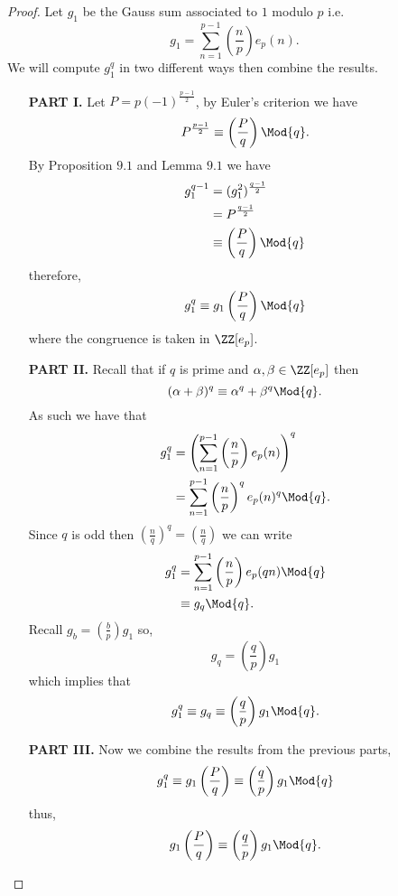 \documentclass[12pt, a4paper]{article}
\begin{document}
\begin{proof}
    Let \(g_1\) be the Gauss sum associated to \(1\) modulo \(p\) i.e. 
    \[g_1 = \sum_{n=1}^{p-1} \left( \frac{n}{p} \right)e_p(n).\]
    We will compute \(g_1^q\) in two different ways then combine the results.
    \begin{enumerate}
        \item[\textbf{PART I.}] Let \(P=p(-1)^{\frac{p-1}{2}}\), by Euler's criterion we have 
        \[P^{\frac{p-1}{2}} \equiv \left( \frac{P}{q} \right) \Mod{q}.\]
        By Proposition \(9.1\) and Lemma \(9.1\) we have
        \[\begin{aligned}
            g_1^{q-1} &= (g_1^2)^{\frac{q-1}{2}} \\
                    &= P^{\frac{q-1}{2}} \\
                    &\equiv \left( \frac{P}{q} \right) \Mod{q}
        \end{aligned}\]
        therefore,
        \[g_1^q \equiv g_1\left( \frac{P}{q} \right) \Mod{q}\]
        where the congruence is taken in \(\ZZ[e_p]\).
        \item[\textbf{PART II.}] Recall that if \(q\) is prime and \(\alpha, \beta \in \ZZ[e_p]\) then
        \[(\alpha+\beta)^q \equiv \alpha^q +\beta^q \Mod{q}.\]
        As such we have that
        \[\begin{aligned}
            g_1^q &= \left( \sum_{n=1}^{p-1} \left( \frac{n}{p} \right) e_p(n)\right)^q \\
            &= \sum_{n=1}^{p-1} \left( \frac{n}{p} \right)^q e_p(n)^q \Mod{q}.
        \end{aligned}\]
        Since \(q\) is odd then \(\left( \frac{n}{q} \right)^q =\left( \frac{n}{q} \right)\) we can write
        \[\begin{aligned}
            g_1^q &=\sum_{n=1}^{p-1} \left( \frac{n}{p} \right) e_p(qn) \Mod{q} \\
            &\equiv g_q \Mod{q}.
        \end{aligned}\]
        Recall \(g_b = \left( \frac{b}{p} \right) g_1\) so,
        \[g_q = \left( \frac{q}{p} \right)g_1\]
        which implies that
        \[g_1^q \equiv g_q \equiv \left( \frac{q}{p} \right)g_1 \Mod{q}.\]
        \item[\textbf{PART III.}] Now we combine the results from the previous parts,
        \[g_1^q \equiv  g_1\left( \frac{P}{q} \right) \equiv\left( \frac{q}{p} \right)g_1 \Mod{q}\]
        thus,
        \[g_1\left( \frac{P}{q} \right) \equiv\left( \frac{q}{p} \right)g_1 \Mod{q}.\]

\end{enumerate}
\end{proof}
\end{document}
